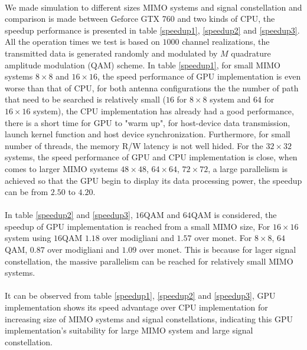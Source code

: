 \documentclass[12pt,a4paper,final]{article}
\begin{document}
\begin{spacing}{2.5}
\paragraph{} We made simulation to different sizes MIMO systems and signal constellation and comparison is made between Geforce GTX 760 and two kinds of CPU, the speedup performance is presented in table \ref{speedup1}, \ref{speedup2} and \ref{speedup3}. All the operation times we test is based on $1000$ channel realizations, the transmitted data is generated randomly and modulated by $M$ quadrature amplitude modulation (QAM) scheme. In table \ref{speedup1}, for small MIMO systems $8\times 8$ and $16\times 16$, the speed performance of GPU implementation is even worse than that of CPU, for both antenna configurations the the number of path that need to be searched is relatively small ($16$ for $8\times 8$ system and $64$ for $16\times 16$ system), the CPU implementation has already had a good performance, there is a short time for GPU to "warm up", for host-device data transmission, launch kernel function and host device synchronization. Furthermore, for small number of threads, the memory R/W latency is not well hided. For the $32\times 32$ systems, the speed performance of GPU and CPU implementation is close, when comes to larger MIMO systems $48\times 48$, $64\times 64$, $72\times 72$, a large parallelism is achieved so that the GPU begin to display its data processing power, the speedup can be from $2.50$ to $4.20$. 
\paragraph{}In table \ref{speedup2} and \ref{speedup3}, $16$QAM and $64$QAM is considered, the speedup of GPU implementation is reached from a small MIMO size, For $16\times 16$ system using $16$QAM $1.18$ over modigliani and $1.57$ over monet. For $8\times 8$, $64$QAM, $0.87$ over modigliani and $1.09$ over monet.  This is because for lager signal constellation, the massive parallelism can be reached for relatively small MIMO systems.
\paragraph{}It can be observed from table \ref{speedup1}, \ref{speedup2} and \ref{speedup3}, GPU implementation shows its speed advantage over CPU implementation for increasing size of MIMO systems and signal constellations, indicating this GPU implementation's suitability for large MIMO system and large signal constellation.

\end{spacing}
\end{document}
